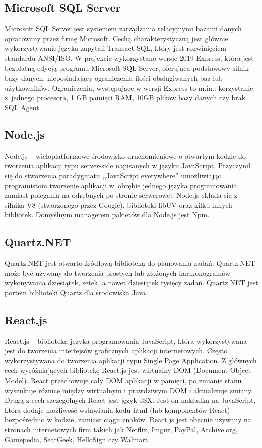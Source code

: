 \documentclass[12pt,a4paper]{article}
\begin{document}
		\subsection{Microsoft SQL Server}		 
		 	\indent Microsoft SQL Server jest systemem zarządzania relacyjnymi bazami danych opracowany przez firmę Microsoft. Cechą charakterystyczną jest głównie wykorzystywanie języka
		 	zapytań	Transact-SQL, który jest rozwinięciem standardu ANSI/ISO. W projekcie wykorzystano wersje 2019 Express, która jest bezpłatną edycją programu Microsoft SQL Server, oferująca
		 	podstawowy silnik bazy danych, nieposiadający ograniczenia ilości obsługiwanych baz lub użytkowników. Ograniczenia, występujące w wersji Express to  m.in.:
		 	korzystanie z~jednego procesora, 1 GB pamięci RAM, 10GB plików bazy danych czy brak SQL Agent.
		
		\subsection{Node.js}
		\indent Node.js – wieloplatformowe środowisko uruchomieniowe o otwartym kodzie do tworzenia aplikacji typu server-side napisanych w języku JavaScript.
			Przyczynił się do stworzenia paradygmatu ,,JavaScript everywhere'' umożliwiając programistom tworzenie aplikacji w~obrębie jednego języka programowania zamiast
			polegania na odrębnych po stronie serwerowej. Node.js składa się z silnika V8 (stworzonego przez Google), biblioteki libUV oraz kilku innych bibliotek.
			Domyślnym managerem pakietów dla Node.js jest Npm. 
		
		\subsection{Quartz.NET}
			\indent Quartz.NET jest otwarto źródłową biblioteką do planowania zadań.
				Quartz.NET może być używany do tworzenia prostych lub złożonych harmonogramów wykonywania
				dziesiątek, setek, a nawet dziesiątek tysięcy zadań.
				Quartz.NET jest portem biblioteki Quartz dla środowiska Java. 	 
		
		\subsection{React.js}
			\indent React.js – biblioteka języka programowania JavaScript, która wykorzystywana jest do tworzenia interfejsów graficznych aplikacji internetowych.
				Często wykorzystywana do tworzenia aplikacji typu Single Page Application. Z głównych cech wyróżniających bibliotekę React.js jest wirtualny DOM
				(Document Object Model). React przechowuje cały DOM aplikacji w pamięci, po zmianie stanu wyszukuje różnice między wirtualnym i prawdziwym DOM
				i aktualizuje zmiany. Drugą z cech szczególnych React jest język JSX. Jest on nakładką na JavaScript, która dodaje możliwość wstawiania kodu html
				(lub komponentów React) bezpośrednio w kodzie, zamiast ciągu znaków. React.js jest obecnie używany na stronach internetowych firm takich
				jak Netflix, Imgur, PayPal, Archive.org, Gamepedia, SeatGeek, HelloSign czy Walmart.
		
\end{document}
